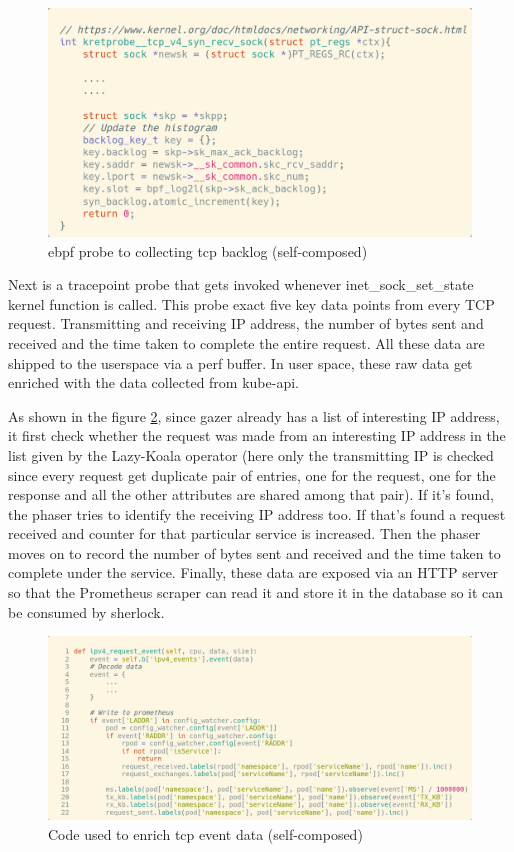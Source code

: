 \begin{figure}[H]
    \includegraphics[width=14cm]{assets/implementation/backlog-probe.png}
    \caption{\ac{ebpf} probe to collecting tcp backlog (self-composed)}
    \label{fig:backlog-probe}
\end{figure}

Next is a tracepoint probe that gets invoked whenever inet\_sock\_set\_state kernel function is called. This probe exact five key data points from every TCP request. Transmitting and receiving IP address, the number of bytes sent and received and the time taken to complete the entire request. All these data are shipped to the userspace via a perf buffer. In user space, these raw data get enriched with the data collected from kube-api. 

As shown in the figure \ref{fig:gazer-enrich}, since gazer already has a list of interesting IP address, it first check whether the request was made from an interesting IP address in the list given by the Lazy-Koala operator (here only the transmitting IP is checked since every request get duplicate pair of entries, one for the request, one for the response and all the other attributes are shared among that pair). If it's found, the phaser tries to identify the receiving IP address too. If that's found a request received and counter for that particular service is increased. Then the phaser moves on to record the number of bytes sent and received and the time taken to complete under the service. Finally, these data are exposed via an HTTP server so that the Prometheus scraper can read it and store it in the database so it can be consumed by sherlock.

\begin{figure}[H]
    \includegraphics[width=14cm]{assets/implementation/gazer-enrich.png}
    \caption{Code used to enrich tcp event data (self-composed)}
    \label{fig:gazer-enrich}
\end{figure}


